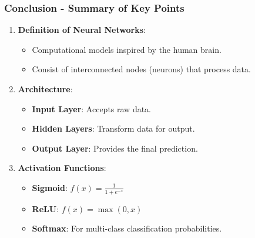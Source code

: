 \documentclass[aspectratio=169]{beamer}
\begin{document}
\begin{frame}[fragile]
    \frametitle{Conclusion - Summary of Key Points}
    \begin{enumerate}
        \item \textbf{Definition of Neural Networks}:
        \begin{itemize}
            \item Computational models inspired by the human brain.
            \item Consist of interconnected nodes (neurons) that process data.
        \end{itemize}

        \item \textbf{Architecture}:
        \begin{itemize}
            \item \textbf{Input Layer}: Accepts raw data.
            \item \textbf{Hidden Layers}: Transform data for output.
            \item \textbf{Output Layer}: Provides the final prediction.
        \end{itemize}

        \item \textbf{Activation Functions}:
        \begin{itemize}
            \item \textbf{Sigmoid}: \( f(x) = \frac{1}{1 + e^{-x}} \)
            \item \textbf{ReLU}: \( f(x) = \max(0, x) \)
            \item \textbf{Softmax}: For multi-class classification probabilities.
        \end{itemize}
    \end{enumerate}
\end{frame}
\end{document}
